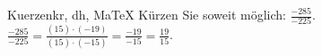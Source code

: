 \begin{MAufgabe}{Kuerzen}{kr, dh, MaTeX}
K\"urzen Sie soweit m\"oglich: $\frac{-285}{-225}$.\\ 
\ifLsg\MLoesung
\quad $\frac{-285}{-225}=\frac{(15)\cdot(-19)}{(15)\cdot(-15)}=\frac{-19}{-15}=\frac{19}{15}$.\else\relax\fi
 \end{MAufgabe}